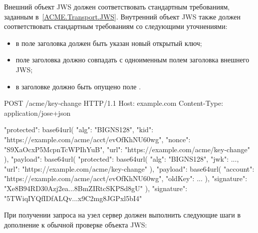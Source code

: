 
Внешний объект JWS должен соответствовать стандартным требованиям,
заданным в~\ref{ACME.Transport.JWS}. Внутренний объект JWS также должен 
соответствовать стандартным требованиям со следующими уточнениями:

\begin{itemize}
\item
в поле  заголовка должен быть указан новый открытый ключ;
\item
поле  заголовка должно совпадать с одноименным 
полем заголовка внешнего JWS;
\item
в заголовке должно быть опущено поле . 
\end{itemize}


\begin{codeblock}
POST /acme/key-change HTTP/1.1
Host: example.com
Content-Type: application/jose+json

{
  "protected": base64url({
    "alg": "BIGNS128",
    "kid": "https://example.com/acme/acct/evOfKhNU60wg",
    "nonce": "S9XaOcxP5McpnTcWPIhYuB",
    "url": "https://example.com/acme/key-change"
  }),
  "payload": base64url({
    "protected": base64url({
      "alg": "BIGNS128",
      "jwk": {...},
      "url": "https://example.com/acme/key-change"
    }),
    "payload": base64url({
      "account": "https://example.com/acme/acct/evOfKhNU60wg",
      "oldKey": {...}
    }),
    "signature": "Xe8B94RD30Azj2ea...8BmZIRtcSKPSd8gU"
  }),
  "signature": "5TWiqIYQfIDfALQv...x9C2mg8JGPxl5bI4"
}
\end{codeblock}
\fi

При получении запроса на узел  сервер должен выполнить 
следующие шаги в дополнение к обычной проверке объекта JWS:


